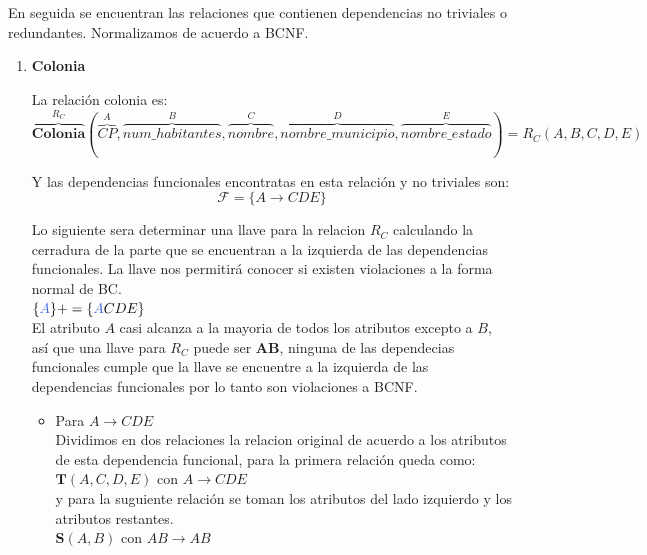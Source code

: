\documentclass[10pt]{article}
\begin{document}
    En seguida se encuentran las relaciones que contienen dependencias no triviales o redundantes. Normalizamos de acuerdo a BCNF.
    
    \begin{enumerate}
    	\item \textbf{Colonia}
    	
    	La relación colonia es:
    	\[\overbrace{{\textbf{Colonia}}}^{\textbf{$R_{C}$}} 
    	(
    	\overbrace{CP}^{A}, \overbrace{num\_habitantes}^{B},
    	\overbrace{nombre}^{C}, \overbrace{nombre\_municipio}^{D}, \overbrace{nombre\_estado}^{E}
    	)
    	= 
    	\textbf{$R_C$}(A,B,C,D,E)
    	\]
    	
    	Y las dependencias funcionales encontratas en esta relación  y no triviales son:\\
    	\[\mathcal{F} = \{A \rightarrow CDE\}\]
    	
    	Lo siguiente sera determinar una llave para la relacion $R_C$ calculando la cerradura de la parte que se encuentran a la izquierda de las dependencias funcionales. La llave nos permitirá conocer si existen violaciones a la forma normal de BC.\\
    	
    	$\{\textcolor{RoyalBlue}{A}\}+= \{\textcolor{RoyalBlue}{A}CDE\}$\\
    	
    	El atributo $A$ casi alcanza a la mayoria de todos los atributos excepto a $B$, así que una llave para $R_C$ puede ser \textbf{AB}, ninguna de las dependecias funcionales cumple que la llave se encuentre a la izquierda de las dependencias funcionales por lo tanto son violaciones a BCNF.\\
    	\begin{itemize}
    		\item Para $A \rightarrow CDE$\\
    		Dividimos en dos relaciones la relacion original de acuerdo a los atributos de esta dependencia funcional, para la primera relación queda como:\\
    		
    		$\textbf{T}(A,C,D,E)$ con $A \rightarrow CDE$\\
    		
    		y para la suguiente relación se toman los atributos del lado izquierdo y los atributos restantes.\\
    		
    		$\textbf{S}(A,B)$ con $AB \rightarrow AB$\\ 
    		

\end{itemize}
\end{enumerate}
\end{document}
